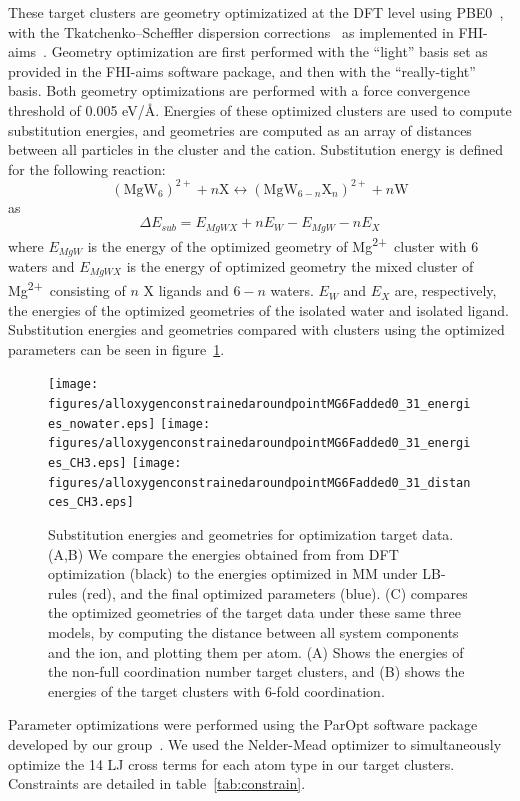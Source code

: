\documentclass[12pt,openany,final]{book}
\newcommand{\mg}{Mg\textsuperscript{2+}}
\begin{document}
These target clusters are geometry optimizatized at the DFT level using PBE0~\cite{adamo:1999:toward},
with the Tkatchenko–Scheffler
dispersion corrections~\cite{tkatchenko:2009} as implemented in FHI-aims~\cite{fhiaims}.
Geometry optimization are first performed with the ``light'' basis set as provided in the
FHI-aims software package, and then with the ``really-tight'' basis. Both
geometry optimizations are performed with a force
convergence threshold of 0.005 eV/\AA. Energies of these optimized clusters are used to compute substitution energies, and
geometries are computed as an array of distances between all particles in the cluster and the cation.
Substitution energy is defined for the following reaction:
\begin{equation}
(\mathrm{Mg} \mathrm{W}_{6})^{2+} + n\mathrm{X} \longleftrightarrow (\mathrm{Mg} \mathrm{W}_{6-n} \mathrm{X}_n)^{2+} + n\mathrm{W}
\end{equation}
as
\begin{equation}
\Delta E_{sub} = E_{MgWX} + nE_{W} - E_{MgW} - nE_{X}
\end{equation}
where $E_{MgW}$ is the energy of the optimized geometry of \mg~cluster with 6 waters and $E_{MgWX}$ is the energy of optimized geometry the mixed cluster of \mg~consisting of $n$ X ligands and $6-n$ waters. $E_{W}$ and $E_X$ are, respectively, the energies of the optimized geometries of the isolated water and isolated ligand.
Substitution energies and geometries compared with clusters using the optimized parameters can be seen in figure~\ref{fig:optres}.


\begin{figure}
    \caption[Substitution energies, and optimized geometries]{Substitution energies and geometries for optimization target data. (A,B) We compare the
        energies obtained from from DFT optimization (black) to the energies optimized in MM under LB-rules (red), and the
    final optimized parameters (blue). (C) compares the optimized geometries of the target data under these same three models,
by computing the distance between all system components and the ion, and plotting them per atom. (A) Shows the energies of the
non-full coordination number target clusters, and (B) shows the energies of the target clusters with 6-fold coordination.}
    \label{fig:optres}
    \texttt{[image: figures/alloxygenconstrainedaroundpointMG6Fadded0\_31\_energies\_nowater.eps]}
    \hspace{1em}
    \texttt{[image: figures/alloxygenconstrainedaroundpointMG6Fadded0\_31\_energies\_CH3.eps]}
    \hspace{1em}
    \texttt{[image: figures/alloxygenconstrainedaroundpointMG6Fadded0\_31\_distances\_CH3.eps]}
    \hspace{1em}
\end{figure}
Parameter optimizations were performed using the ParOpt software package developed by our group~\cite{fogarty:2014:paropt}. We used the Nelder-Mead optimizer to simultaneously optimize
the 14 LJ cross terms for each atom type in our target clusters. Constraints are detailed in table~\ref{tab:constrain}.
\end{document}
